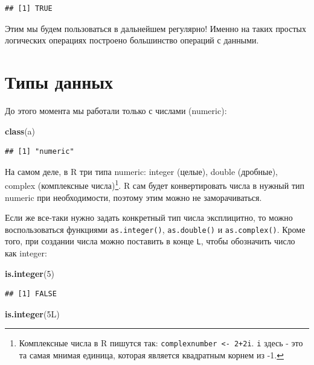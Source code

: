 \documentclass[]{book}
\newenvironment{Shaded}{\begin{snugshade}}{\end{snugshade}}
\newcommand{\KeywordTok}[1]{\textcolor[rgb]{0.13,0.29,0.53}{\textbf{#1}}}
\newcommand{\DecValTok}[1]{\textcolor[rgb]{0.00,0.00,0.81}{#1}}
\newcommand{\NormalTok}[1]{#1}
\begin{document}
\begin{verbatim}
## [1] TRUE
\end{verbatim}

Этим мы будем пользоваться в дальнейшем регулярно! Именно на таких
простых логических операциях построено большинство операций с данными.

\section{Типы данных}\label{data_types}

До этого момента мы работали только с числами (numeric):

\begin{Shaded}
\begin{Highlighting}[]
\KeywordTok{class}\NormalTok{(a)}
\end{Highlighting}
\end{Shaded}

\begin{verbatim}
## [1] "numeric"
\end{verbatim}

На самом деле, в R три типа numeric: integer (целые), double (дробные),
complex (комплексные числа)\footnote{Комплексные числа в R пишутся так:
  \texttt{complexnumber\ \textless{}-\ 2+2i}. \texttt{i} здесь - это та
  самая мнимая единица, которая является квадратным корнем из -1.}. R
сам будет конвертировать числа в нужный тип numeric при необходимости,
поэтому этим можно не заморачиваться.

Если же все-таки нужно задать конкретный тип числа эксплицитно, то можно
воспользоваться функциями \texttt{as.integer()}, \texttt{as.double()} и
\texttt{as.complex()}. Кроме того, при создании числа можно поставить в
конце \texttt{L}, чтобы обозначить число как integer:

\begin{Shaded}
\begin{Highlighting}[]
\KeywordTok{is.integer}\NormalTok{(}\DecValTok{5}\NormalTok{)}
\end{Highlighting}
\end{Shaded}

\begin{verbatim}
## [1] FALSE
\end{verbatim}

\begin{Shaded}
\begin{Highlighting}[]
\KeywordTok{is.integer}\NormalTok{(5L)}
\end{Highlighting}
\end{Shaded}
\end{document}
